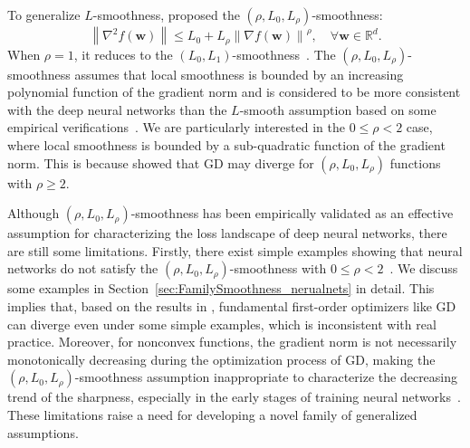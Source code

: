 \documentclass{article}
\newcommand{\Norm}[1]{\left\|#1\right\|}
\newcommand{\bw}{\mathbf{w}}
\begin{document}
To generalize $L$-smoothness, \cite{li2023convex} proposed the $(\rho,L_0,L_\rho)$-smoothness:
$$\Norm{\nabla^2 f(\bw)}\leq L_0+L_\rho\Norm{\nabla f(\bw)}^\rho,\quad\forall\bw\in\mathbb{R}^d.$$
When $\rho=1$, it reduces to the $(L_0,L_1)$-smoothness~\citep{zhang2020gradient}. The $(\rho,L_0,L_\rho)$-smoothness assumes that local smoothness is bounded by an increasing polynomial function of the gradient norm and is considered to be more consistent with the deep neural networks than the 
$L$-smooth assumption based on some empirical verifications~\citep{zhang2020gradient}. We are particularly interested in the 
$0\leq\rho<2$ case, where local smoothness is bounded by a sub-quadratic function of the gradient norm. This is because \cite{li2023convex} 
showed that GD may diverge for $(\rho,L_0,L_\rho)$ functions with $\rho\geq 2$. 

Although $(\rho,L_0,L_\rho)$-smoothness has been empirically validated as an effective assumption for characterizing the loss landscape of deep neural networks, there are still some limitations.
Firstly, there exist simple examples showing that neural networks do not satisfy the $(\rho,L_0,L_\rho)$-smoothness with $0\leq\rho<2$~\citep{patel2022global}. We discuss some examples in Section~\ref{sec:FamilySmoothness_nerualnets} in detail. This implies that, based on the results in \cite{li2023convex}, fundamental first-order optimizers like GD can diverge even under some simple examples, which is inconsistent with real practice.
Moreover, for nonconvex functions, the gradient norm is not necessarily monotonically decreasing during the optimization process of GD, 
{making the $(\rho,L_0,L_\rho)$-smoothness assumption inappropriate to characterize the decreasing trend of the sharpness, especially in the early stages of training neural networks~\citep{kalra2024warmup, gilmer2022loss}.}
These limitations raise a need for developing a novel family of generalized assumptions.
\end{document}
